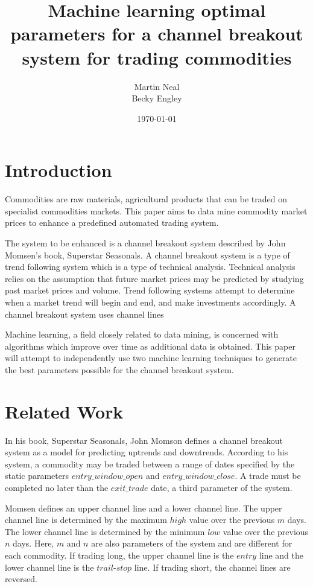 \documentclass[10pt]{article}
\title{Machine learning optimal parameters for a channel breakout system for trading
commodities}
\author{Martin Neal\\
  Becky Engley}
\date{\today}
\begin{document}
\section{Introduction}

Commodities are raw materials, agricultural products that can be traded on
specialist commodities markets.  This paper aims to data mine commodity market
prices to enhance a predefined automated trading system.

The system to be enhanced is a channel breakout system described by John
Momsen's book, Superstar Seasonals.  A channel breakout system is a type of
trend following system which is a type of technical analysis.  Technical
analysis relies on the assumption that future market prices may be predicted by
studying past market prices and volume.  Trend following systems attempt to
determine when a market trend will begin and end, and make investments
accordingly.  A channel breakout system uses channel lines

Machine learning, a field closely related to data mining, is concerned with
algorithms which improve over time as additional data is obtained.  This paper
will attempt to independently use two machine learning techniques to generate
the best parameters possible for the channel breakout system.


\section{Related Work}

In his book, Superstar Seasonals, John Momson defines a channel breakout system
as a model for predicting uptrends and downtrends.  According to his system, a
commodity may be traded between a range of dates specified by the static parameters
$entry\_window\_open$ and $entry\_window\_close$.  A trade must be completed no
later than the $exit\_trade$ date, a third parameter of the system.

Momsen defines an upper channel line and a lower channel line.  The upper
channel line is determined by the maximum $high$ value over the previous $m$
days.  The lower channel line is determined by the minimum $low$ value over the
previous $n$ days.  Here, $m$ and $n$ are also parameters of the system and are
different for each commodity.  If trading long, the upper channel line is the
$entry$ line and the lower channel line is the $trail$-$stop$ line.  If trading
short, the channel lines are reversed.
\end{document}
